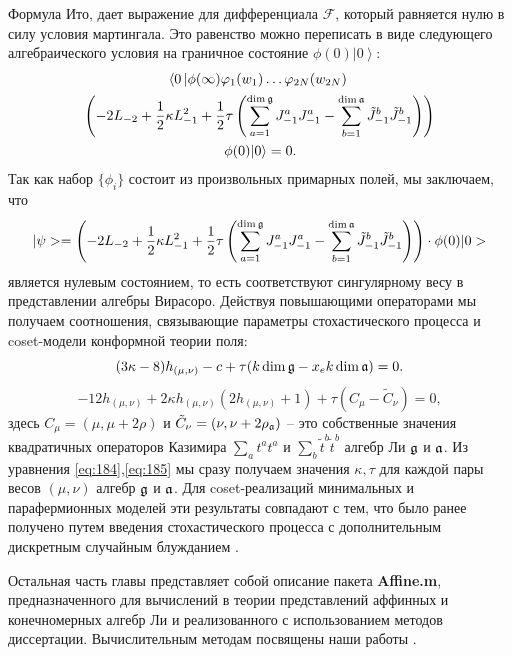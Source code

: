 \documentclass[14pt,autoref,href,facsimile
]{disser}
\begin{document}
Формула Ито, дает выражение для дифференциала $\mathcal{F}$, который равняется нулю в силу условия мартингала. Это равенство можно переписать в виде следующего алгебраического условия на граничное состояние $\phi(0)\left|0\right>$:
\begin{multline}
\label{eq:182}
  \left<0\left|\phi(\infty)\varphi_{1}(w_{1})\dots\varphi_{2N}(w_{2N})\right.\right.\\
  \left(-2L_{-2}+\frac{1}{2}\kappa L_{-1}^{2}+\frac{1}{2}\tau \left(\sum_{a=1}^{\dim\mathfrak{g}}J^{a}_{-1}J^{a}_{-1}-\sum_{b=1}^{\dim\mathfrak{a}}\tilde{J}^{b}_{-1}\tilde{J}^{b}_{-1}\right)\right)\\
\left.\phi(0)|0\right>=0.
\end{multline}
Так как набор  $\{\phi_{i}\}$ состоит из произвольных примарных полей, мы заключаем, что 
\begin{multline}
\label{eq:126}
|\psi>=\left(-2L_{-2}+\frac{1}{2}\kappa L_{-1}^{2}+\frac{1}{2}\tau \left(\sum_{a=1}^{\dim\mathfrak{g}}J^{a}_{-1}J^{a}_{-1}-\sum_{b=1}^{\dim\mathfrak{a}}\tilde{J}^{b}_{-1}\tilde{J}^{b}_{-1}\right)\right)
\cdot\phi(0)|0>
\end{multline}
является нулевым состоянием, то есть соответствуют сингулярному весу в представлении алгебры Вирасоро. Действуя повышающими операторами мы получаем соотношения, связывающие параметры стохастического процесса и coset-модели конформной теории поля:
\begin{equation}
 (3\kappa-8)h_{(\mu,\nu)}-c+\tau (k\dim\mathfrak{g}-x_{e}k\dim\mathfrak{a}) =0.
 \label{eq:184}
\end{equation}
\begin{equation}
\label{eq:185}
 -12 h_{(\mu,\nu)}+2\kappa h_{(\mu,\nu)} (2h_{(\mu,\nu)}+1) + \tau
(C_{\mu}-\tilde{C}_{\nu})=0,
\end{equation}
здесь $C_{\mu}=(\mu,\mu+2\rho)$ и $\tilde{C}_{\nu}=(\nu,\nu+2\rho_{\mathfrak{a}})$ -- это собственные значения квадратичных операторов Казимира $\sum_{a}t^{a}t^{a}$ и $\sum_{b}\tilde{t}^{b}\tilde{t}^{b}$ алгебр Ли $\mathfrak{g}$ и $\mathfrak{a}$.
Из уравнения  \eqref{eq:184},\eqref{eq:185} мы сразу получаем значения  $\kappa,\tau$ для каждой пары весов $(\mu,\nu)$ алгебр $\mathfrak{g}$ и $\mathfrak{a}$. Для coset-реализаций минимальных и парафермионных моделей эти результаты совпадают с тем, что было ранее получено путем введения стохастического процесса с дополнительным дискретным случайным блужданием  \cite{santachiara2008sle}. 

Остальная часть главы представляет собой описание пакета {\bf Affine.m}, предназначенного для вычислений в теории представлений аффинных и конечномерных алгебр Ли и реализованного с использованием методов диссертации. Вычислительным методам посвящены наши работы .
\end{document}
